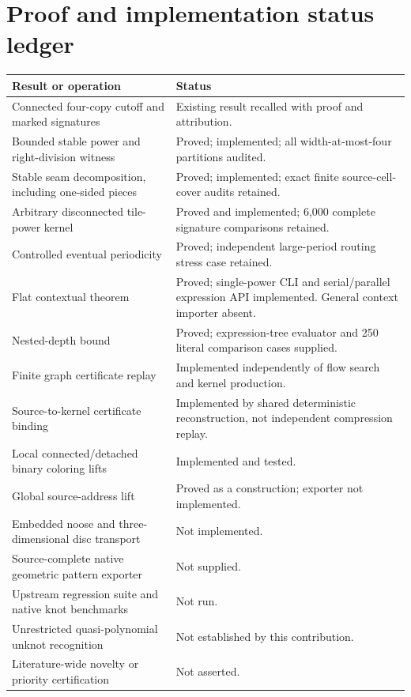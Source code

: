 \documentclass[11pt]{article}
\theoremstyle{remark}\newtheorem{remark}[theorem]{Remark}
\begin{document}
\section{Proof and implementation status ledger}
\begin{longtable}{p{.42\linewidth}p{.51\linewidth}}\toprule
Result or operation & Status\\\midrule\endhead
Connected four-copy cutoff and marked signatures & Existing result recalled with proof and attribution.\\
Bounded stable power and right-division witness & Proved; implemented; all width-at-most-four partitions audited.\\
Stable seam decomposition, including one-sided pieces & Proved; implemented; exact finite source-cell-cover audits retained.\\
Arbitrary disconnected tile-power kernel & Proved and implemented; 6,000 complete signature comparisons retained.\\
Controlled eventual periodicity & Proved; independent large-period routing stress case retained.\\
Flat contextual theorem & Proved; single-power CLI and serial/parallel expression API implemented. General context importer absent.\\
Nested-depth bound & Proved; expression-tree evaluator and 250 literal comparison cases supplied.\\
Finite graph certificate replay & Implemented independently of flow search and kernel production.\\
Source-to-kernel certificate binding & Implemented by shared deterministic reconstruction, not independent compression replay.\\
Local connected/detached binary coloring lifts & Implemented and tested.\\
Global source-address lift & Proved as a construction; exporter not implemented.\\
Embedded noose and three-dimensional disc transport & Not implemented.\\
Source-complete native geometric pattern exporter & Not supplied.\\
Upstream regression suite and native knot benchmarks & Not run.\\
Unrestricted quasi-polynomial unknot recognition & Not established by this contribution.\\
Literature-wide novelty or priority certification & Not asserted.\\\bottomrule
\end{longtable}
\end{document}
